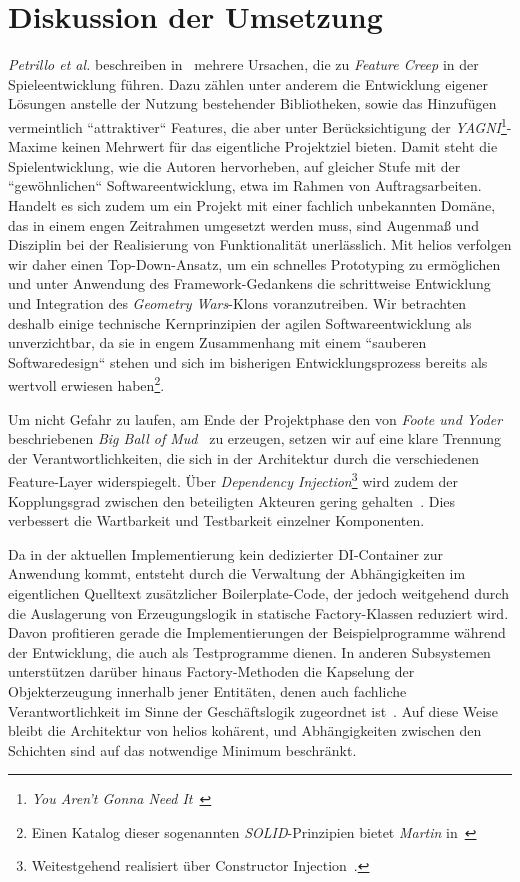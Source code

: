 \section{Diskussion der Umsetzung}

\textit{Petrillo et al.} beschreiben in~\cite[]{PPTD08} mehrere Ursachen, die zu \textit{Feature Creep} in der Spieleentwicklung führen.
Dazu zählen unter anderem die Entwicklung eigener Lösungen anstelle der Nutzung bestehender Bibliotheken, sowie das Hinzufügen vermeintlich ``attraktiver`` Features, die aber unter Berücksichtigung der \textit{YAGNI}\footnote{\textit{You Aren't Gonna Need It}~\cite[]{Sch07}}-Maxime keinen Mehrwert für das eigentliche Projektziel bieten.
Damit steht die Spielentwicklung, wie die Autoren hervorheben, auf gleicher Stufe mit der ``gewöhnlichen`` Softwareentwicklung, etwa im Rahmen von Auftragsarbeiten.
Handelt es sich zudem um ein Projekt mit einer fachlich unbekannten Domäne, das in einem engen Zeitrahmen umgesetzt werden muss, sind Augenmaß und Disziplin bei der Realisierung von Funktionalität unerlässlich.
Mit helios verfolgen wir daher einen Top-Down-Ansatz, um ein schnelles Prototyping zu ermöglichen und unter Anwendung des Framework-Gedankens die schrittweise Entwicklung und Integration des \textit{Geometry Wars}-Klons voranzutreiben.
Wir betrachten deshalb einige technische Kernprinzipien der agilen Softwareentwicklung als unverzichtbar, da sie in engem Zusammenhang mit einem ``sauberen Softwaredesign`` stehen und sich im bisherigen Entwicklungsprozess bereits als wertvoll erwiesen haben\footnote{Einen Katalog dieser sogenannten \textit{SOLID}-Prinzipien bietet \textit{Martin} in~\cite[]{Mar03}}.\par

Um nicht Gefahr zu laufen, am Ende der Projektphase den von \textit{Foote und Yoder} beschriebenen  \textit{Big Ball of Mud}~\cite[]{FY99} zu erzeugen, setzen wir auf eine klare Trennung der Verantwortlichkeiten, die sich in der Architektur durch die verschiedenen Feature-Layer widerspiegelt.
Über \textit{Dependency Injection}\footnote{
    Weitestgehend realisiert über Constructor Injection~\cite[]{FowlerDI}.
} wird zudem der Kopplungsgrad zwischen den beteiligten Akteuren gering gehalten~\cite[]{SZ10}.
Dies verbessert die Wartbarkeit und Testbarkeit einzelner Komponenten.\par
Da in der aktuellen Implementierung kein dedizierter DI-Container zur Anwendung kommt, entsteht durch die Verwaltung der Abhängigkeiten im eigentlichen Quelltext zusätzlicher Boilerplate-Code, der jedoch weitgehend durch die Auslagerung von Erzeugungslogik in statische Factory-Klassen reduziert wird.
Davon profitieren gerade die Implementierungen der Beispielprogramme während der Entwicklung, die auch als Testprogramme dienen.
In anderen Subsystemen unterstützen darüber hinaus Factory-Methoden die Kapselung der Objekterzeugung innerhalb jener Entitäten, denen auch fachliche Verantwortlichkeit im Sinne der Geschäftslogik zugeordnet ist~\cite[139 f.]{Eva03}.
Auf diese Weise bleibt die Architektur von helios kohärent, und Abhängigkeiten zwischen den Schichten sind auf das notwendige Minimum beschränkt.
\par

